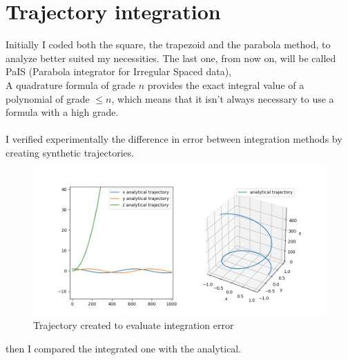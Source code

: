 \chapter{Trajectory integration}
\label{chap:trajectory_integration}

Initially I coded both the square, the trapezoid and the parabola method, to analyze better suited my necessities. \cite{casciola} The last one, from now on, will be called PaIS (Parabola integrator for Irregular Spaced data),  \\
A quadrature formula of grade $n$ provides the exact integral value of a polynomial of grade $\leq n$, which means that it isn't always necessary to use a formula with a high grade. \\
\\
\justify
I verified experimentally the difference in error between integration methods by creating synthetic trajectories.
\begin{figure}[H]
\centering
\includegraphics[scale=0.6]{spring.png}
\caption{Trajectory created to evaluate integration error}
\end{figure}
\justify
then I compared the integrated one with the analytical.
